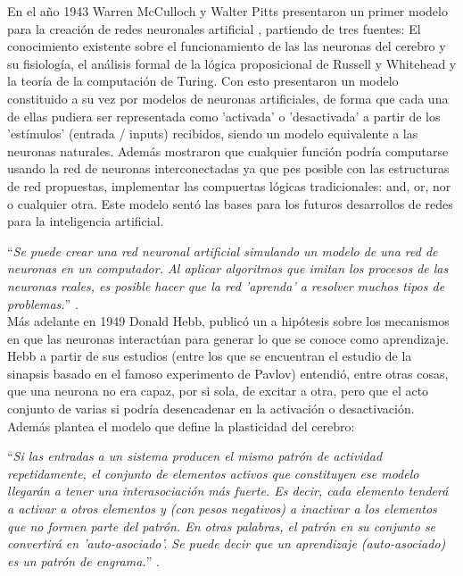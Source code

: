             En el año 1943 Warren McCulloch y Walter Pitts presentaron un primer modelo para la creación de redes neuronales artificial \cite{McCulloch1943}, partiendo de tres fuentes: El conocimiento existente sobre el funcionamiento de las las neuronas del cerebro y su fisiología, el análisis formal de la lógica proposicional de Russell y Whitehead y la teoría de la computación de Turing. Con esto presentaron un modelo constituido a su vez por modelos de neuronas artificiales, de forma que cada una de ellas pudiera ser representada como 'activada' o 'desactivada' a partir de los 'estímulos' (entrada / inputs) recibidos, siendo un modelo equivalente a las neuronas naturales. Además mostraron que cualquier función podría computarse usando la red de neuronas interconectadas ya que pes posible con las estructuras de red propuestas, implementar las compuertas lógicas tradicionales: and, or, nor o cualquier otra. Este modelo sentó las bases para los futuros desarrollos de redes para la inteligencia artificial.
            
            ``\textit{Se puede crear una red neuronal artificial simulando un modelo de una red de neuronas en un computador. Al aplicar algoritmos que imitan los procesos de las neuronas reales, es posible hacer que la red 'aprenda' a resolver muchos tipos de problemas.}'' \cite{Krogh2008}. \\
            
            Más adelante en 1949 Donald Hebb, publicó un a hipótesis sobre los mecanismos en que las neuronas interactúan para generar lo que se conoce como aprendizaje. Hebb a partir de sus estudios (entre los que se encuentran el estudio de la sinapsis basado en el famoso experimento de Pavlov) entendió, entre otras cosas, que una neurona no era capaz, por si sola, de excitar a otra, pero que el acto conjunto de varias si podría desencadenar en la activación o desactivación. Además plantea el modelo que define la plasticidad del cerebro:
            
            ``\textit{Si las entradas a un sistema producen el mismo patrón de actividad repetidamente, el conjunto de elementos activos que constituyen ese modelo llegarán a tener una interasociación más fuerte. Es decir, cada elemento tenderá a activar a otros elementos y (con pesos negativos) a inactivar a los elementos que no formen parte del patrón. En otras palabras, el patrón en su conjunto se convertirá en 'auto-asociado'. Se puede decir que un aprendizaje (auto-asociado) es un patrón de engrama.}'' \cite{Hebb1949}. \\
            
